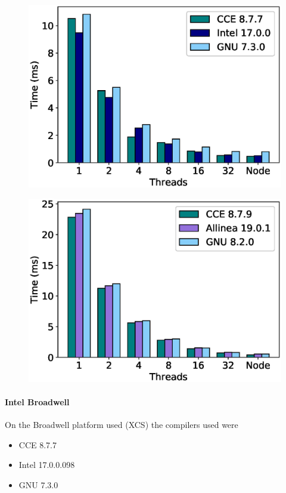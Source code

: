 \begin{figure}
\centering\includegraphics[scale=0.5]{figs/Broadwell_microbenchmark_vanilla.eps}
\caption{}
\end{figure}

\begin{figure}
\centering\includegraphics[scale=0.5]{figs/ThunderX2_microbenchmark_vanilla.eps}
\caption{}
\end{figure}

\paragraph{Intel Broadwell}
On the Broadwell platform used (XCS) the compilers used were
\begin{itemize}
\item CCE 8.7.7
\item Intel 17.0.0.098
\item GNU 7.3.0
\end{itemize}

